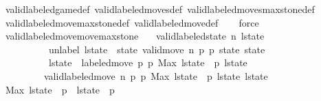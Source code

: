 \begin{isabellebody}
\ valid{\isacharunderscore}labeled{\isacharunderscore}game{\isacharunderscore}def\ valid{\isacharunderscore}labeled{\isacharunderscore}moves{\isacharunderscore}def\ valid{\isacharunderscore}labeled{\isacharunderscore}moves{\isacharunderscore}max{\isacharunderscore}stone{\isacharunderscore}def\isanewline
\ \ \isamarkupfalse%
\ valid{\isacharunderscore}labeled{\isacharunderscore}move{\isacharunderscore}max{\isacharunderscore}stone{\isacharunderscore}def\ valid{\isacharunderscore}labeled{\isacharunderscore}move{\isacharunderscore}def\isanewline
\ \ \isamarkupfalse%
\ force%
\endisatagproof
{\isafoldproof}%
%
\isadelimproof
\isanewline
%
\endisadelimproof
\isanewline
{}\isamarkupfalse%
\ valid{\isacharunderscore}labeled{\isacharunderscore}move{\isacharunderscore}move{\isacharunderscore}max{\isacharunderscore}stone{\isacharcolon}\isanewline
\ \ \ {\isachardoublequoteopen}valid{\isacharunderscore}labeled{\isacharunderscore}state\ n\ l{\isacharunderscore}state{\isachardoublequoteclose}\isanewline
\ \ \ \ \ \ \ \ \ \ {\isachardoublequoteopen}unlabel\ l{\isacharunderscore}state\ {\isacharequal}\ state{\isachardoublequoteclose}\ {\isachardoublequoteopen}valid{\isacharunderscore}move{\isacharprime}\ n\ p{}\ p{}\ state\ state{\isacharprime}{\isachardoublequoteclose}\isanewline
\ \ \ \ \ \ \ \ \ \ {\isachardoublequoteopen}l{\isacharunderscore}state{\isacharprime}\ {\isacharequal}\ labeled{\isacharunderscore}move\ p{}\ p{}\ {\isacharparenleft}Max\ {\isacharparenleft}l{\isacharunderscore}state\ {\isacharbang}\ p{}{\isacharparenright}{\isacharparenright}\ l{\isacharunderscore}state{\isachardoublequoteclose}\isanewline
\ \ \ \ \ \ \ \ \ {\isachardoublequoteopen}valid{\isacharunderscore}labeled{\isacharunderscore}move{\isacharprime}\ n\ p{}\ p{}\ {\isacharparenleft}Max\ {\isacharparenleft}l{\isacharunderscore}state\ {\isacharbang}\ p{}{\isacharparenright}{\isacharparenright}\ l{\isacharunderscore}state\ l{\isacharunderscore}state{\isacharprime}{\isachardoublequoteclose}\isanewline
%
\isadelimproof
%
\endisadelimproof
%
\isatagproof
{}\isamarkupfalse%
{\isacharminus}\isanewline
\ \ \isamarkupfalse%
\ {\isachardoublequoteopen}Max\ {\isacharparenleft}l{\isacharunderscore}state\ {\isacharbang}\ p{}{\isacharparenright}\ {\isasymin}\ l{\isacharunderscore}state\ {\isacharbang}\ p{}{\isachardoublequoteclose}\isanewline
\ \ \ \ \isamarkupfalse%

\end{isabellebody}
